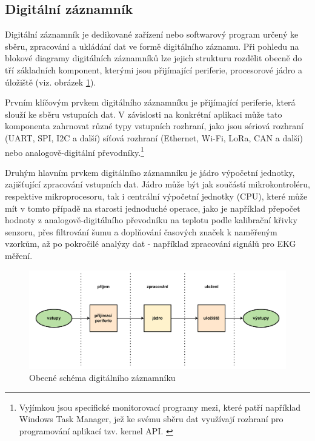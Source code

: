     
\subsection{Digitální záznamník}
\label{digitalni_zaznamik}
Digitální záznamník je dedikované zařízení nebo softwarový program určený ke sběru, zpracování a ukládání dat ve formě digitálního záznamu. Při pohledu na blokové diagramy digitálních záznamníků lze jejich strukturu rozdělit obecně do tří základních komponent, kterými jsou přijímající periferie, procesorové jádro a úložiště (viz. obrázek \ref{fig:common-digital-datalogger}). \cite{researchgate_general_dataloggger_multiple_sdcards, ieee_digital_sound_recorder_arm_sd_card, ieee_multi_connectivity_datalogger_sd_card}

Prvním klíčovým prvkem digitálního záznamníku je přijímající periferie, která slouží ke sběru vstupních dat. V závislosti na konkrétní aplikaci může tato komponenta zahrnovat různé typy vstupních rozhraní, jako jsou sériová rozhraní (UART, SPI, I2C a další) síťová rozhraní (Ethernet, Wi-Fi, LoRa, CAN a další) nebo analogově-digitální převodníky.\footnote{Vyjímkou jsou specifické monitorovací programy mezi, které patří například Windows Task Manager, jež ke svému sběru dat využívají rozhraní pro programování aplikací tzv. kernel API. \cite{fourcore_win_process_birth}} \cite{ieee_digital_sound_recorder_arm_sd_card}


Druhým hlavním prvkem digitálního záznamníku je jádro výpočetní jednotky, zajišťující zpracování vstupních dat. Jádro může být jak součástí mikrokontroléru, respektive mikroprocesoru, tak i centrální výpočetní jednotky (CPU), které může mít v tomto případě na starosti jednoduché operace, jako je například přepočet hodnoty z analogově-digitálního převodníku na teplotu podle kalibrační křivky senzoru, přes filtrování šumu a doplňování časových značek k naměřeným vzorkům, až po pokročilé analýzy dat - například zpracování signálů pro EKG měření. \cite{springer_development_ECG_recorder}

\begin{figure}[h]
    \centering
    \includegraphics[width=1.00\textwidth]{obrazky-figures/common_digital_datalogger_scheme.pdf}
    \caption{Obecné schéma digitálního záznamníku}
    \label{fig:common-digital-datalogger}
\end{figure}

